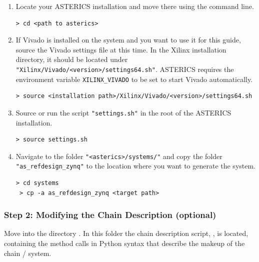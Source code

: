 \begin{enumerate}
\item Locate your ASTERICS installation and move there using the command line.
\begin{lstlisting}[style=shell]
 > cd <path to asterics>
\end{lstlisting}
\item If Vivado is installed on the system and you want to use it for this guide, source the Vivado settings file at this time.
In the Xilinx installation directory, it should be located under \texttt{"Xilinx/Vivado/<version>/settings64.sh"}.
ASTERICS requires the environment variable \texttt{XILINX\_VIVADO} to be set to start Vivado automatically.
\begin{lstlisting}[style=shell]
 > source <installation path>/Xilinx/Vivado/<version>/settings64.sh
\end{lstlisting}
\item Source or run the script \texttt{"settings.sh"} in the root of the ASTERICS installation.
\begin{lstlisting}[style=shell]
 > source settings.sh
\end{lstlisting}
\item Navigate to the folder \texttt{"<asterics>/systems/"} and copy the folder \texttt{"as\_refdesign\_zynq"} to the location where you want to generate the system.
\begin{lstlisting}[style=shell]
 > cd systems
 > cp -a as_refdesign_zynq <target path>
\end{lstlisting}
\end{enumerate}


\subsubsection{Step 2: Modifying the Chain Description (optional)}

Move into the directory .
In this folder the chain description script, , is located, containing the method calls in Python syntax that describe the makeup of the \asterics chain / system.

